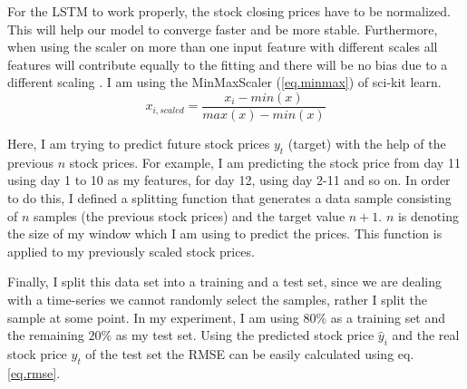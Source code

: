 \documentclass[fleqn,10pt]{SelfArx} %
\begin{document}
For the LSTM to work properly, the stock closing prices have to be normalized. This will help our model to converge faster and be more stable. Furthermore, when using the scaler on more than one input feature with different scales all features will contribute equally to the fitting and there will be no bias due to a different scaling \cite{normalize}. I am using the MinMaxScaler (\ref{eq.minmax}) of sci-kit learn.
\begin{equation}
x_{i,scaled}=\dfrac{x_i-min(x)}{max(x)-min(x)}
\label{eq.minmax}
\end{equation}

Here, I am trying to predict future stock prices $y_t$ (target) with the help of the previous $n$ stock prices. For example, I am predicting the stock price from day 11 using day 1 to 10 as my features, for day 12, using day 2-11 and so on. In order to do this, I defined a splitting function that generates a data sample consisting of $n$ samples (the previous stock prices) and the target value $n + 1$. $n$ is denoting the size of my window which I am using to predict the prices. This function is applied to my previously scaled stock prices. 

Finally, I split this data set into a training and a test set, since we are dealing with a time-series we cannot randomly select the samples, rather I split the sample at some point. In my experiment, I am using $80\%$ as a training set and the remaining $20\%$ as my test set. Using the predicted stock price $\hat{y}_i$ and the real stock price $y_t$ of the test set the RMSE can be easily calculated using eq. \ref{eq.rmse}.

\begin{table}[hbt]
	\caption{Overview of the model parameters.}
	\centering

\label{table.model} 
\end{table}
\end{document}
